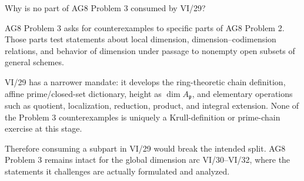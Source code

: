 \begin{problem}\label{prob:vi29-20}
Why is no part of AG8 Problem 3 consumed by VI/29?

\end{problem}

\ifdefined\FullProblemDossiers
\begin{solution}
AG8 Problem 3 asks for counterexamples to specific parts of AG8 Problem 2.  Those parts test statements about
local dimension, dimension--codimension relations, and behavior of dimension under passage to nonempty open
subsets of general schemes.

VI/29 has a narrower mandate: it develops the ring-theoretic chain definition, affine prime/closed-set dictionary,
height as \(\dim A_{\mathfrak p}\), and elementary operations such as quotient, localization, reduction, product,
and integral extension.  None of the Problem 3 counterexamples is uniquely a Krull-definition or prime-chain
exercise at this stage.

Therefore consuming a subpart in VI/29 would break the intended split.  AG8 Problem 3 remains intact for the
global dimension arc VI/30--VI/32, where the statements it challenges are actually formulated and analyzed.
\end{solution}
\fi
